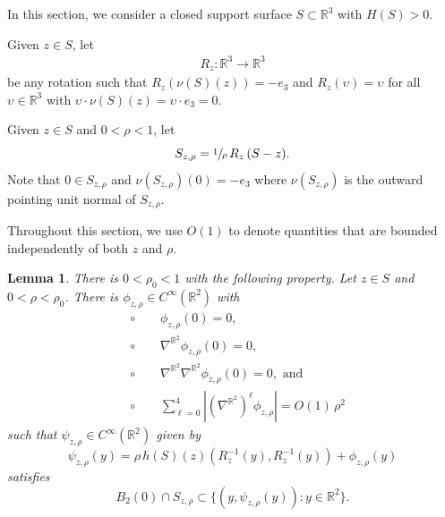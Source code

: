 \documentclass[11pt]{amsart}
\newtheorem{lem}[prop]{Lemma}
\begin{document}
In this section, we consider a closed support surface $S\subset \mathbb{R}^3$ with  $H(S)>0$.


 Given $z\in S$, let 
 \begin{align} \label{rotation} R_z:\mathbb{R}^3\to \mathbb{R}^3
 	\end{align}  be any rotation such that  $R_z(\nu(S)(z))=-e_3$ and $R_z(\upsilon)=\upsilon$ for all $\upsilon\in \mathbb{R}^3$ with  $\upsilon\cdot \nu(S)(z)=\upsilon\cdot e_3=0$. 



Given $z\in S$ and $0<\rho<1$, let $$S_{z,\rho}=\sfrac{1}{\rho}\,R_z\,(S-z).$$ Note that $0\in S_{z,\rho}$ and  $\nu(S_{z,\rho})(0)=-e_3$ where  $\nu(S_{z,\rho})$ is the outward pointing unit normal of $S_{z,\rho}$.

Throughout this section, we use $O(1)$ to denote quantities that are bounded independently of  both $z$ and $\rho$.


\begin{lem} \label{local graph} There is $0<\rho_0<1$ with the following property. Let $z\in S$ and $0<\rho<\rho_0$. There is $\phi_{z,\rho}\in C^\infty(\mathbb{R}^2)$ 
	with 
	\begin{align*}
	&\circ\qquad  \phi_{z,\rho}(0)=0, \\
	&\circ\qquad  \nabla^{\mathbb{R}^2} \phi_{z,\rho}(0)=0,\\
	&\circ \qquad  \nabla^{\mathbb{R}^2}\nabla^{\mathbb{R}^2} \phi_{z,\rho}(0)=0, \text{ and}\\
	&\circ\qquad \sum_{\ell=0}^4|(\nabla^{\mathbb{R}^2})^\ell\phi_{z,\rho}|=O(1)\,\rho^2
	\end{align*} 
	such that  $\psi_{z,\rho} \in C^\infty(\mathbb{R}^2)$ given by 
	$$
	\psi_{z,\rho}(y)=\rho\,h(S)(z)(R^{-1}_z(y),R^{-1}_z(y))+\phi_{z,\rho}(y)
	$$
	satisfies $$
	B_{2}(0)\cap S_{z,\rho}\subset \{(y,\psi_{z,\rho}(y)):y\in \mathbb{R}^2\}.
	$$
	
\end{lem}
\end{document}
